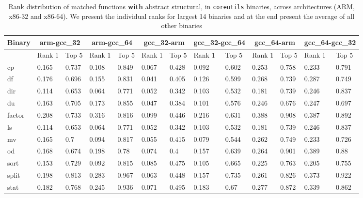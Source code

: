\begin{appendices}
\begin{table}[!ht]
	\begin{center}
		\caption{Rank distribution of matched functions \textbf{with} abstract structural, in \texttt{coreutils} binaries, across architectures (ARM, x86-32 and x86-64). We present the individual ranks for largest 14 binaries and at the end present the average of all other binaries \\}
		\label{tab:cross-arch-with-behav}
		\scriptsize
\begin{tabular}{ | l | l | l | l | l | l | l | l | l | l | l | l | l | }
\hline
	Binary & \multicolumn{2}{c|}{arm-gcc\_32} & \multicolumn{2}{c|}{arm-gcc\_64}  & \multicolumn{2}{c|}{gcc\_32-arm}  & \multicolumn{2}{c|}{gcc\_32-gcc\_64} & \multicolumn{2}{c|}{gcc\_64-arm}  & \multicolumn{2}{c|}{gcc\_64-gcc\_32}  \\ \hline
	 & Rank 1 & Top 5 & Rank 1 & Top 5 & Rank 1 & Top 5 & Rank 1 & Top 5 & Rank 1 & Top 5 & Rank 1 & Top 5 \\ \hline
	cp & 0.165 & 0.737 & 0.108 & 0.849 & 0.067 & 0.428 & 0.092 & 0.602 & 0.253 & 0.758 & 0.233 & 0.791 \\ \hline
	df & 0.176 & 0.696 & 0.155 & 0.831 & 0.041 & 0.405 & 0.126 & 0.599 & 0.268 & 0.739 & 0.287 & 0.749 \\ \hline
	dir & 0.114 & 0.653 & 0.064 & 0.771 & 0.052 & 0.342 & 0.103 & 0.532 & 0.181 & 0.739 & 0.246 & 0.837 \\ \hline
	du & 0.163 & 0.705 & 0.173 & 0.855 & 0.047 & 0.384 & 0.101 & 0.576 & 0.246 & 0.676 & 0.247 & 0.697 \\ \hline
	factor & 0.208 & 0.733 & 0.316 & 0.816 & 0.099 & 0.446 & 0.216 & 0.631 & 0.388 & 0.908 & 0.387 & 0.892 \\ \hline
	ls & 0.114 & 0.653 & 0.064 & 0.771 & 0.052 & 0.342 & 0.103 & 0.532 & 0.181 & 0.739 & 0.246 & 0.837 \\ \hline
	mv & 0.165 & 0.7 & 0.094 & 0.817 & 0.055 & 0.415 & 0.079 & 0.544 & 0.262 & 0.749 & 0.233 & 0.726 \\ \hline
	od & 0.168 & 0.674 & 0.198 & 0.78 & 0.074 & 0.4 & 0.157 & 0.639 & 0.264 & 0.901 & 0.389 & 0.88 \\ \hline
	sort & 0.153 & 0.729 & 0.092 & 0.815 & 0.085 & 0.475 & 0.105 & 0.665 & 0.225 & 0.763 & 0.205 & 0.755 \\ \hline
	split & 0.198 & 0.813 & 0.283 & 0.967 & 0.063 & 0.448 & 0.157 & 0.735 & 0.261 & 0.826 & 0.373 & 0.922 \\ \hline
	stat & 0.182 & 0.768 & 0.245 & 0.936 & 0.071 & 0.495 & 0.183 & 0.67 & 0.277 & 0.872 & 0.339 & 0.862 \\ \hline

\end{tabular}
\end{center}
\end{table}
\end{appendices}
